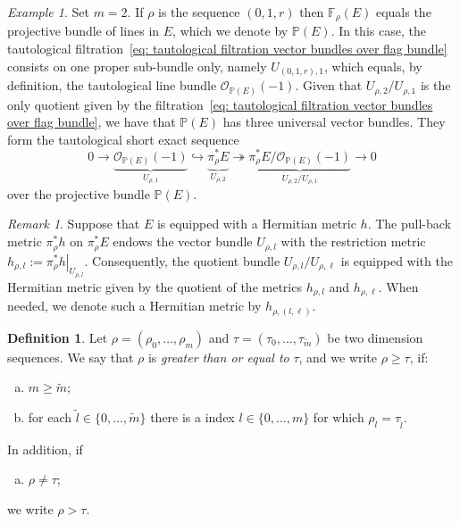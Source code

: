 \documentclass[a4paper]{amsart}
\theoremstyle{plain}%
\theoremstyle{definition}
\newtheorem{definition}[theorem]{Definition}
\theoremstyle{remark}
\newtheorem{remark}[theorem]{Remark}
\newtheorem{example}[theorem]{Example}
\newcommand{\PP}{\mathbb{P}}
\newcommand{\FF}{\mathbb{F}}
\begin{document}
\begin{example}\label{ex: projectivized}
	Set $ m = 2 $.
	If $ \rho $ is the sequence $ (0,1,r) $ then $ \FF_{\rho}(E) $ equals the projective bundle of lines in $ E $, which we denote by $ \PP(E) $.
	In this case, the tautological filtration~\eqref{eq: tautological filtration vector bundles over flag bundle} consists on one proper sub-bundle only, namely $ U_{(0,1,r),1} $, which equals, by definition, the tautological line bundle $ \mathcal{O}_{\PP(E)}(-1) $.
	Given that $ U_{\rho,2} / U_{\rho,1} $ is the only quotient given by the filtration~\eqref{eq: tautological filtration vector bundles over flag bundle}, we have that $ \PP(E) $ has three universal vector bundles.
	They form the tautological short exact sequence
	\begin{equation}\label{eq: tautological sequence of projective bundle}
		0 \to \underbrace{\mathcal{O}_{\PP(E)}(-1)}_{U_{\rho,1}} \hookrightarrow \underbrace{\pi_{\rho}^{*} E}_{U_{\rho,2}} \twoheadrightarrow \underbrace{\pi_{\rho}^{*}E/ \mathcal{O}_{\PP(E)}(-1)}_{U_{\rho,2} / U_{\rho,1}} \to 0
	\end{equation}
	over the projective bundle $ \PP(E) $.
\end{example}

\begin{remark}\label{rem: notation for metrics}
	Suppose that $ E $ is equipped with a Hermitian metric $ h $.
	The pull-back metric $ \pi_{\rho}^{*}h $ on $ \pi_{\rho}^{*}E $ endows the vector bundle $ U_{\rho,l} $ with the restriction metric $ h_{\rho,l} := \left. \pi_{\rho}^{*} h \right|_{U_{\rho,l}} $.
	Consequently, the quotient bundle $ U_{\rho,l}/U_{\rho,\ell} $ is equipped with the Hermitian metric given by the quotient of the metrics $ h_{\rho,l} $ and $ h_{\rho,\ell} $.
	When needed, we denote such a Hermitian metric by $ h_{\rho,(l,\ell)} $.
\end{remark}

\begin{definition}
	Let $ \rho = (\rho_0,\dots,\rho_m) $ and $ \tau = (\tau_0,\dots,\tau_{\tilde{m}}) $ be two dimension sequences.
	We say that $ \rho $ is \emph{greater than or equal to} $ \tau $, and we write $ \rho \ge \tau $, if:
	\begin{enumerate}[(a)]
		\item $ m \ge \tilde{m} $;\label{conditionpt:minore}
		\item for each $ \tilde{l} \in \{ 0,\dots, \tilde{m} \} $ there is a index $ l \in \{0,\dots, m\} $ for which $ \rho_l = \tau_{\tilde{l}} $.\label{conditionpt:sequenzasuriettiva}
	\end{enumerate}
	In addition, if
	\begin{enumerate}[(c)]
		\item $ \rho \neq \tau $;
	\end{enumerate}
	we write $ \rho > \tau $.
\end{definition}
\end{document}
